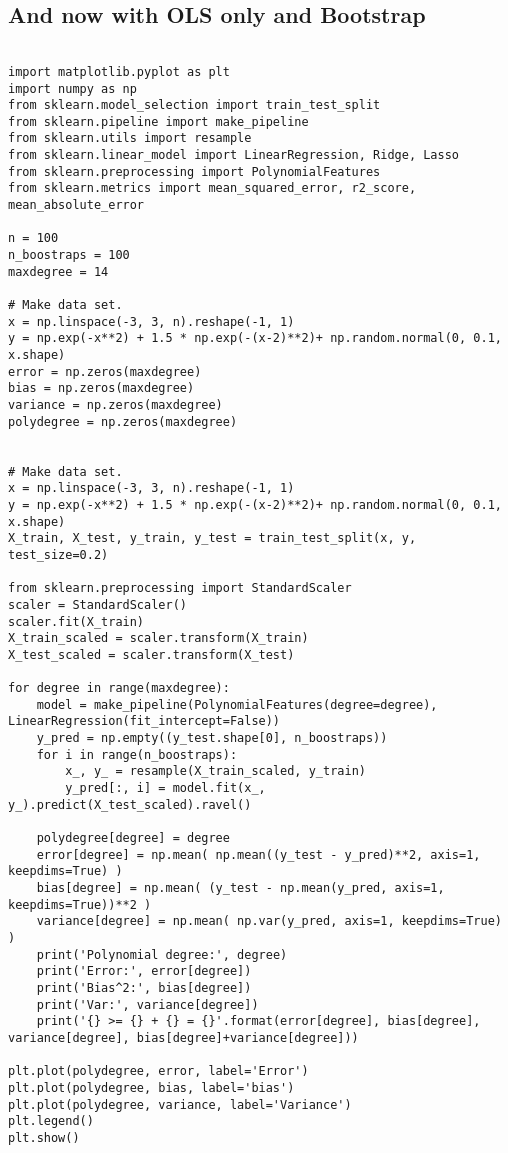 \documentclass[%
oneside,                 %
final,                   %
10pt]{article}
\begin{document}
\subsection*{And now with OLS only and Bootstrap}

\begin{verbatim}

import matplotlib.pyplot as plt
import numpy as np
from sklearn.model_selection import train_test_split
from sklearn.pipeline import make_pipeline
from sklearn.utils import resample
from sklearn.linear_model import LinearRegression, Ridge, Lasso
from sklearn.preprocessing import PolynomialFeatures
from sklearn.metrics import mean_squared_error, r2_score, mean_absolute_error

n = 100
n_boostraps = 100
maxdegree = 14

# Make data set.
x = np.linspace(-3, 3, n).reshape(-1, 1)
y = np.exp(-x**2) + 1.5 * np.exp(-(x-2)**2)+ np.random.normal(0, 0.1, x.shape)
error = np.zeros(maxdegree)
bias = np.zeros(maxdegree)
variance = np.zeros(maxdegree)
polydegree = np.zeros(maxdegree)


# Make data set.
x = np.linspace(-3, 3, n).reshape(-1, 1)
y = np.exp(-x**2) + 1.5 * np.exp(-(x-2)**2)+ np.random.normal(0, 0.1, x.shape)
X_train, X_test, y_train, y_test = train_test_split(x, y, test_size=0.2)

from sklearn.preprocessing import StandardScaler
scaler = StandardScaler()
scaler.fit(X_train)
X_train_scaled = scaler.transform(X_train)
X_test_scaled = scaler.transform(X_test)

for degree in range(maxdegree):
    model = make_pipeline(PolynomialFeatures(degree=degree), LinearRegression(fit_intercept=False))
    y_pred = np.empty((y_test.shape[0], n_boostraps))
    for i in range(n_boostraps):
        x_, y_ = resample(X_train_scaled, y_train)
        y_pred[:, i] = model.fit(x_, y_).predict(X_test_scaled).ravel()

    polydegree[degree] = degree
    error[degree] = np.mean( np.mean((y_test - y_pred)**2, axis=1, keepdims=True) )
    bias[degree] = np.mean( (y_test - np.mean(y_pred, axis=1, keepdims=True))**2 )
    variance[degree] = np.mean( np.var(y_pred, axis=1, keepdims=True) )
    print('Polynomial degree:', degree)
    print('Error:', error[degree])
    print('Bias^2:', bias[degree])
    print('Var:', variance[degree])
    print('{} >= {} + {} = {}'.format(error[degree], bias[degree], variance[degree], bias[degree]+variance[degree]))

plt.plot(polydegree, error, label='Error')
plt.plot(polydegree, bias, label='bias')
plt.plot(polydegree, variance, label='Variance')
plt.legend()
plt.show()



\end{verbatim}


\end{document}
